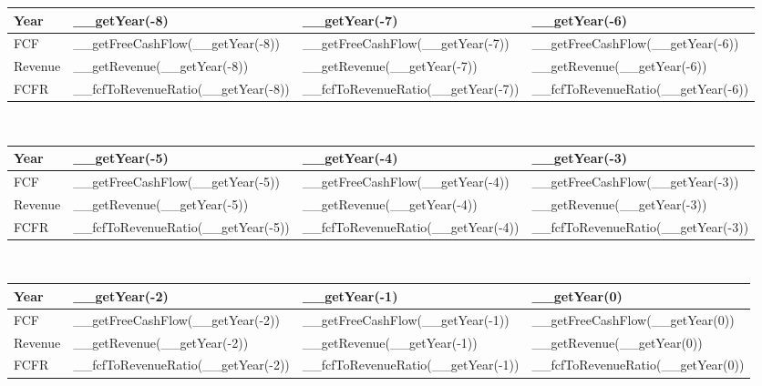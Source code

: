 \begin{tabularx}{\textwidth}{|X|X|X|X|}
 \hline
 Year                       & __getYear(-8)                      & __getYear(-7)                      & __getYear(-6)                      \\
 \hline
 FCF                        & __getFreeCashFlow(__getYear(-8))   & __getFreeCashFlow(__getYear(-7))   & __getFreeCashFlow(__getYear(-6))   \\
 Revenue                    & __getRevenue(__getYear(-8))        & __getRevenue(__getYear(-7))        & __getRevenue(__getYear(-6))        \\
 \rowcolor{lightgray} FCFR  & __fcfToRevenueRatio(__getYear(-8)) & __fcfToRevenueRatio(__getYear(-7)) & __fcfToRevenueRatio(__getYear(-6)) \\
 \hline
\end{tabularx}\\

\begin{tabularx}{\textwidth}{|X|X|X|X|}
 \hline
 Year                       & __getYear(-5)                      & __getYear(-4)                      & __getYear(-3)                      \\
 \hline
 FCF                        & __getFreeCashFlow(__getYear(-5))   & __getFreeCashFlow(__getYear(-4))   & __getFreeCashFlow(__getYear(-3))   \\
 Revenue                    & __getRevenue(__getYear(-5))        & __getRevenue(__getYear(-4))        & __getRevenue(__getYear(-3))        \\
 \rowcolor{lightgray} FCFR  & __fcfToRevenueRatio(__getYear(-5)) & __fcfToRevenueRatio(__getYear(-4)) & __fcfToRevenueRatio(__getYear(-3)) \\
 \hline
\end{tabularx}\\

\begin{tabularx}{\textwidth}{|X|X|X|X|}
 \hline
 Year                       & __getYear(-2)                      & __getYear(-1)                      & __getYear(0)                      \\
 \hline
 FCF                        & __getFreeCashFlow(__getYear(-2))   & __getFreeCashFlow(__getYear(-1))   & __getFreeCashFlow(__getYear(0))   \\
 Revenue                    & __getRevenue(__getYear(-2))        & __getRevenue(__getYear(-1))        & __getRevenue(__getYear(0))        \\
 \rowcolor{lightgray} FCFR  & __fcfToRevenueRatio(__getYear(-2)) & __fcfToRevenueRatio(__getYear(-1)) & __fcfToRevenueRatio(__getYear(0)) \\
 \hline
\end{tabularx}


